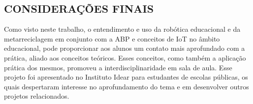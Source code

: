 \documentclass[a0,portrait,brazil]{a0poster}
\begin{document}
\begin{multicols}{3}
\begin{large}
\color{black}
\section*{CONSIDERAÇÕES FINAIS}

Como visto neste trabalho, o entendimento e uso da robótica educacional e da metarreciclagem em conjunto com a ABP e conceitos de IoT no âmbito educacional, pode proporcionar aos alunos um contato mais aprofundado com a prática, aliado aos conceitos teóricos. Esses conceitos, como também a aplicação prática dos mesmos, promoveu a interdisciplinaridade em sala de aula. Esse projeto foi apresentado no Instituto Idear para estudantes de escolas públicas, os quais despertaram interesse no aprofundamento do tema e em desenvolver outros projetos relacionados. 


\vspace{-1cm}
\color{black}
\renewcommand{\refname}{REFERÊNCIAS}


\end{large}
\end{multicols}
\end{document}
